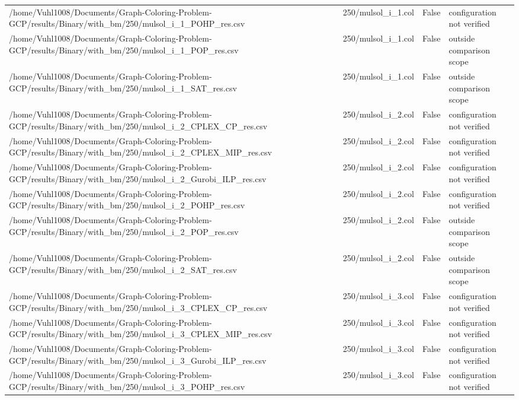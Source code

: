 \begin{table}[htbp]
\begin{tabular}{llll}
/home/Vuhl1008/Documents/Graph-Coloring-Problem-GCP/results/Binary/with\_bm/250/mulsol\_i\_1\_POHP\_res.csv & 250/mulsol\_i\_1.col & False & configuration not verified \\
/home/Vuhl1008/Documents/Graph-Coloring-Problem-GCP/results/Binary/with\_bm/250/mulsol\_i\_1\_POP\_res.csv & 250/mulsol\_i\_1.col & False & outside comparison scope \\
/home/Vuhl1008/Documents/Graph-Coloring-Problem-GCP/results/Binary/with\_bm/250/mulsol\_i\_1\_SAT\_res.csv & 250/mulsol\_i\_1.col & False & outside comparison scope \\
/home/Vuhl1008/Documents/Graph-Coloring-Problem-GCP/results/Binary/with\_bm/250/mulsol\_i\_2\_CPLEX\_CP\_res.csv & 250/mulsol\_i\_2.col & False & configuration not verified \\
/home/Vuhl1008/Documents/Graph-Coloring-Problem-GCP/results/Binary/with\_bm/250/mulsol\_i\_2\_CPLEX\_MIP\_res.csv & 250/mulsol\_i\_2.col & False & configuration not verified \\
/home/Vuhl1008/Documents/Graph-Coloring-Problem-GCP/results/Binary/with\_bm/250/mulsol\_i\_2\_Gurobi\_ILP\_res.csv & 250/mulsol\_i\_2.col & False & configuration not verified \\
/home/Vuhl1008/Documents/Graph-Coloring-Problem-GCP/results/Binary/with\_bm/250/mulsol\_i\_2\_POHP\_res.csv & 250/mulsol\_i\_2.col & False & configuration not verified \\
/home/Vuhl1008/Documents/Graph-Coloring-Problem-GCP/results/Binary/with\_bm/250/mulsol\_i\_2\_POP\_res.csv & 250/mulsol\_i\_2.col & False & outside comparison scope \\
/home/Vuhl1008/Documents/Graph-Coloring-Problem-GCP/results/Binary/with\_bm/250/mulsol\_i\_2\_SAT\_res.csv & 250/mulsol\_i\_2.col & False & outside comparison scope \\
/home/Vuhl1008/Documents/Graph-Coloring-Problem-GCP/results/Binary/with\_bm/250/mulsol\_i\_3\_CPLEX\_CP\_res.csv & 250/mulsol\_i\_3.col & False & configuration not verified \\
/home/Vuhl1008/Documents/Graph-Coloring-Problem-GCP/results/Binary/with\_bm/250/mulsol\_i\_3\_CPLEX\_MIP\_res.csv & 250/mulsol\_i\_3.col & False & configuration not verified \\
/home/Vuhl1008/Documents/Graph-Coloring-Problem-GCP/results/Binary/with\_bm/250/mulsol\_i\_3\_Gurobi\_ILP\_res.csv & 250/mulsol\_i\_3.col & False & configuration not verified \\
/home/Vuhl1008/Documents/Graph-Coloring-Problem-GCP/results/Binary/with\_bm/250/mulsol\_i\_3\_POHP\_res.csv & 250/mulsol\_i\_3.col & False & configuration not verified \\

\end{tabular}
\end{table}
